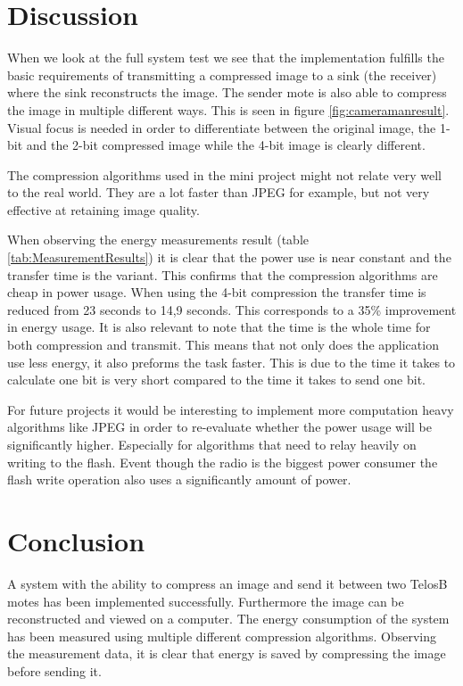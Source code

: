 \section{Discussion}
When we look at the full system test we see that the implementation fulfills the basic requirements of transmitting a compressed image to a sink (the receiver) where the sink reconstructs the image. 
The sender mote is also able to compress the image in multiple different ways. 
This is seen in figure \ref{fig:cameramanresult}. Visual focus is needed in order to differentiate between the original image, the 1-bit and the 2-bit compressed image while the 4-bit image is clearly different.

The compression algorithms used in the mini project might not relate very well to the real world. 
They are a lot faster than  JPEG for example, but not very effective at retaining image quality.

When observing the energy measurements result (table \ref{tab:MeasurementResults}) it is clear that the power use is near constant and the transfer time is the variant. 
This confirms that the compression algorithms are cheap in power usage. 
When using the 4-bit compression the transfer time is reduced from 23 seconds to 14,9 seconds. 
This corresponds to a 35\% improvement in energy usage. 
It is also relevant to note that the time is the whole time for both compression and transmit. 
This means that not only does the application use less energy, it also preforms the task faster. 
This is due to the time it takes to calculate one bit is very short compared to the time it takes to send one bit. 

For future projects it would be interesting to implement more computation heavy algorithms like JPEG in order to re-evaluate whether the power usage will be significantly higher. 
Especially for algorithms that need to relay heavily on writing to the flash. 
Event though the radio is the biggest power consumer the flash write operation also uses a significantly amount of power. 





\section{Conclusion}

A system with the ability to compress an image and send it between two TelosB motes has been implemented successfully. 
Furthermore the image can be reconstructed and viewed on a computer.
The energy consumption of the system has been measured using multiple different compression algorithms. 
Observing the measurement data, it is clear that energy is saved by compressing the image before sending it. 